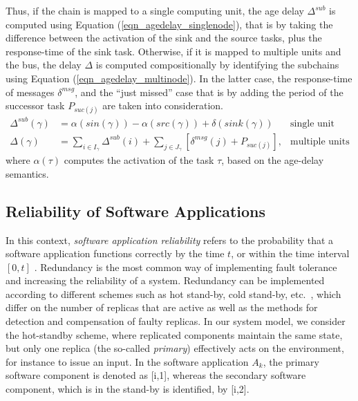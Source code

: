Thus, if the chain is mapped to a single computing unit, the age delay  $\Delta^{sub}$ is computed using Equation (\ref{eqn_agedelay_singlenode}), that is by taking the difference between the activation of the sink and the source tasks, plus the response-time of the sink task. Otherwise, if it is mapped to multiple units and the bus, the delay $\Delta$ is computed compositionally by identifying the subchains using Equation (\ref{eqn_agedelay_multinode}). In the latter case, the response-time of messages $\delta^{msg}$, and the ``just missed'' case that is by adding the period of the successor task $P_{suc(j)}$ are  taken into consideration. 
\begin{align}
	\label{eqn_agedelay_singlenode}
	\Delta^{sub}(\gamma) &= \alpha(sin(\gamma))-\alpha(src(\gamma)) + \delta(sink(\gamma)) & \text{single unit}\\
	\label{eqn_agedelay_multinode}
	\Delta(\gamma)&=\sum_{i\in I_{\gamma}}{\Delta^{sub}(i)} + \sum_{j\in  J_{\gamma}}{[\delta^{msg}(j)+P_{suc(j)}]}, &\text{multiple units}
\end{align}
where $\alpha(\tau)$ computes the activation of the task $\tau$, based on the age-delay semantics.

\subsection{Reliability of Software Applications}\label{sub_reliability}
In this context, \textit{software application reliability} refers to the probability that a software application functions correctly by the time $t$, or within the time interval $[0, t]$ \cite{Goel1985SoftwareApplicability}. Redundancy is the most common way of implementing fault tolerance and increasing the reliability of a system. Redundancy can be implemented according to different schemes such as hot stand-by, cold stand-by, etc.~\cite{Dubrova2013Fault-tolerantDesign}, which differ on the number of replicas that are active as well as the methods for detection and compensation of faulty replicas. In our system model, we consider the hot-standby scheme, where replicated components maintain the same state, but only one replica (the so-called \textit{primary}) effectively acts on the environment, for instance to issue an input. In the software application $A_k$, the primary software component is denoted as [i,1], whereas the secondary software component, which is in the stand-by is identified, by [i,2].

